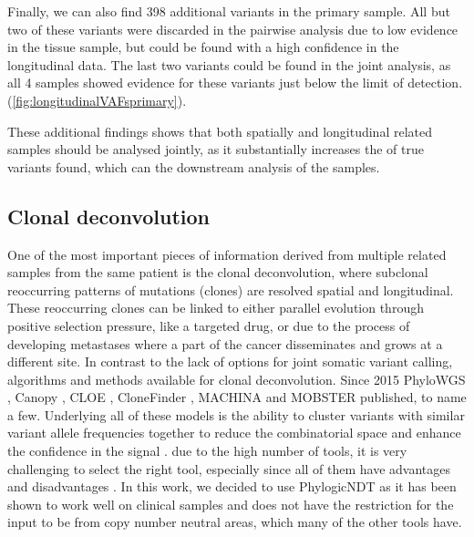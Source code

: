 Finally, we can also find 398 additional variants in the primary sample. All but two of these variants were discarded in the pairwise analysis due to low evidence in the tissue sample, but could be found with a high confidence in the longitudinal data. The last two variants could be found in the joint analysis, as all 4 samples showed evidence for these variants just below the limit of detection.  (\autoref{fig:longitudinalVAFsprimary}). 

These additional findings shows that both spatially and longitudinal related samples should be analysed jointly, as it substantially increases the  of true variants found, which can  the downstream analysis of the samples.



\subsection[Clonal deconvolution]{Clonal deconvolution}
\label{variantcalling-sec:clonal}

One of the most important pieces of information derived from multiple related samples from the same patient is the clonal deconvolution, where subclonal reoccurring patterns of mutations (clones) are resolved spatial and longitudinal. These reoccurring clones can be linked to either parallel evolution through positive selection pressure, like a targeted drug, or due to the process of developing metastases where a part of the cancer disseminates and grows at a different site.
In contrast to the lack of options for joint somatic variant calling,  algorithms and methods  available for clonal deconvolution. Since 2015 PhyloWGS \cite{Deshwar2015}, Canopy \cite{Jiang2016}, CLOE \cite{Marass2016}, CloneFinder \cite{Miura2018}, MACHINA \cite{ElKebir2018} and MOBSTER \cite{Caravagna2020}  published, to name a few. Underlying all of these models is the ability to cluster variants with similar variant allele frequencies together to reduce the combinatorial space and enhance the confidence in the signal \cite{Tarabichi2021}.  due to the high number of tools, it is very challenging to select the right tool, especially since all of them have advantages and disadvantages \cite{Miura2020}. In this work, we decided to use PhylogicNDT \cite{Leshchiner2018} as it has been shown to work well on clinical samples \cite{Gerstung2020} and does not have the restriction for the input to be from copy number neutral areas, which many of the other tools have.


